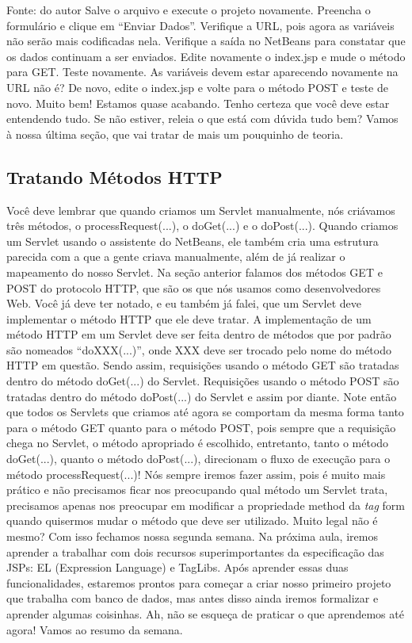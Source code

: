 Fonte: do autor
Salve o arquivo e execute o projeto novamente. Preencha o formulário e clique em ``Enviar Dados''. Verifique a URL, pois agora as variáveis não serão mais codificadas nela. Verifique a saída no NetBeans para constatar que os dados continuam a ser enviados. Edite novamente o index.jsp e mude o método para GET. Teste novamente. As variáveis devem estar aparecendo novamente na URL não é? De novo, edite o index.jsp e volte para o método POST e teste de novo.
Muito bem! Estamos quase acabando. Tenho certeza que você deve estar entendendo tudo. Se não estiver, releia o que está com dúvida tudo bem? Vamos à nossa última seção, que vai tratar de mais um pouquinho de teoria.



\subsection{Tratando Métodos HTTP}

Você deve lembrar que quando criamos um Servlet manualmente, nós criávamos três métodos, o processRequest(...), o doGet(...) e o doPost(...). Quando criamos um Servlet usando o assistente do NetBeans, ele também cria uma estrutura parecida com a que a gente criava manualmente, além de já realizar o mapeamento do nosso Servlet. Na seção anterior falamos dos métodos GET e POST do protocolo HTTP, que são os que nós usamos como desenvolvedores Web. Você já deve ter notado, e eu também já falei, que um Servlet deve implementar o método HTTP que ele deve tratar. A implementação de um método HTTP em um Servlet deve ser feita dentro de métodos que por padrão são nomeados ``doXXX(...)'', onde XXX deve ser trocado pelo nome do método HTTP em questão. Sendo assim, requisições usando o método GET são tratadas dentro do método doGet(...) do Servlet. Requisições usando o método POST são tratadas dentro do método doPost(...) do Servlet e assim por diante.
Note então que todos os Servlets que criamos até agora se comportam da mesma forma tanto para o método GET quanto para o método POST, pois sempre que a requisição chega no Servlet, o método apropriado é escolhido, entretanto, tanto o método doGet(...), quanto o método doPost(...), direcionam o fluxo de execução para o método processRequest(...)! Nós sempre iremos fazer assim, pois é muito mais prático e não precisamos ficar nos preocupando qual método um Servlet trata, precisamos apenas nos preocupar em modificar a propriedade method da \textit{tag} form quando quisermos mudar o método que deve ser utilizado. 
Muito legal não é mesmo? Com isso fechamos nossa segunda semana. Na próxima aula, iremos aprender a trabalhar com dois recursos superimportantes da especificação das JSPs: EL (Expression Language) e TagLibs. Após aprender essas duas funcionalidades, estaremos prontos para começar a criar nosso primeiro projeto que trabalha com banco de dados, mas antes disso ainda iremos formalizar e aprender algumas coisinhas. Ah, não se esqueça de praticar o que aprendemos até agora! Vamos ao resumo da semana.



